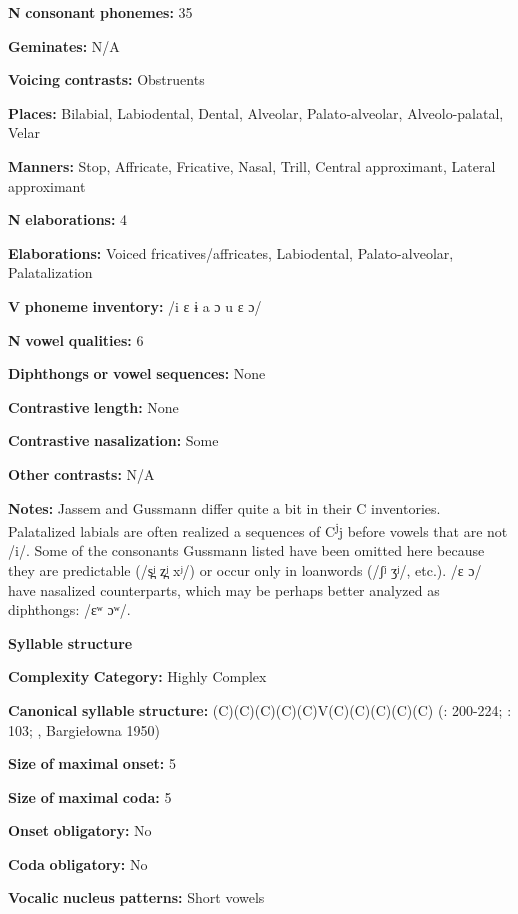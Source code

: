 \textbf{N} \textbf{consonant} \textbf{phonemes:} 35

\textbf{Geminates:} N/A

\textbf{Voicing} \textbf{contrasts:} Obstruents

\textbf{Places:} Bilabial, Labiodental, Dental, Alveolar, Palato-alveolar, Alveolo-palatal, Velar

\textbf{Manners:} Stop, Affricate, Fricative, Nasal, Trill, Central approximant, Lateral approximant

\textbf{N} \textbf{elaborations:} 4

\textbf{Elaborations:} Voiced fricatives/affricates, Labiodental, Palato-alveolar, Palatalization

\textbf{V} \textbf{phoneme} \textbf{inventory:} /i ɛ ɨ a ɔ u ɛ ɔ/

\textbf{N} \textbf{vowel} \textbf{qualities:} 6

\textbf{Diphthongs} \textbf{or} \textbf{vowel} \textbf{sequences:} None

\textbf{Contrastive} \textbf{length:} None

\textbf{Contrastive} \textbf{nasalization:} Some

\textbf{Other} \textbf{contrasts:} N/A

\textbf{Notes:} Jassem and Gussmann differ quite a bit in their C inventories. Palatalized labials are often realized a sequences of C\textsuperscript{j}j before vowels that are not /i/. Some of the consonants Gussmann listed have been omitted here because they are predictable (/s̪ʲ z̪ʲ xʲ/) or occur only in loanwords (/ʃʲ ʒʲ/, etc.). /ɛ ɔ/ have nasalized counterparts, which may be perhaps better analyzed as diphthongs: /ɛʷ ɔʷ/.

\textbf{Syllable} \textbf{structure}

\textbf{Complexity} \textbf{Category:} Highly Complex

\textbf{Canonical} \textbf{syllable} \textbf{structure:} (C)(C)(C)(C)(C)V(C)(C)(C)(C)(C) (\citealt{Gussmann2007}: 200-224; \citealt{Jassem2003}: 103; \citealt{Zydorowicz2010}, Bargiełowna 1950)

\textbf{Size} \textbf{of} \textbf{maximal} \textbf{onset:} 5

\textbf{Size} \textbf{of} \textbf{maximal} \textbf{coda:} 5

\textbf{Onset} \textbf{obligatory:} No

\textbf{Coda} \textbf{obligatory:} No

\textbf{Vocalic} \textbf{nucleus} \textbf{patterns:} Short vowels

